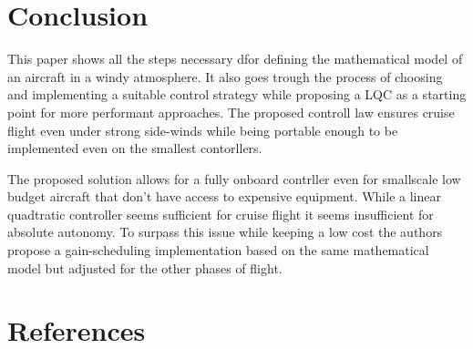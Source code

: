 \documentclass[conference]{IEEEtran}
\begin{document}
\section{Conclusion}
This paper shows all the steps necessary dfor defining the mathematical model of an aircraft in a windy atmosphere. It also goes trough the process of choosing and implementing a suitable control strategy while proposing a LQC as a starting point for more performant approaches. The proposed controll law ensures cruise flight even under strong side-winds while being portable enough to be implemented even on the smallest contorllers.
\par
The proposed solution allows for a fully onboard contrller even for smallscale low budget aircraft that don't have access to expensive equipment. While a linear quadtratic controller seems sufficient for cruise flight it seems insufficient for absolute autonomy. To surpass this issue while keeping a low cost the authors propose a gain-scheduling implementation based on the same mathematical model but adjusted for the other phases of flight.


\section*{References}
\end{document}

